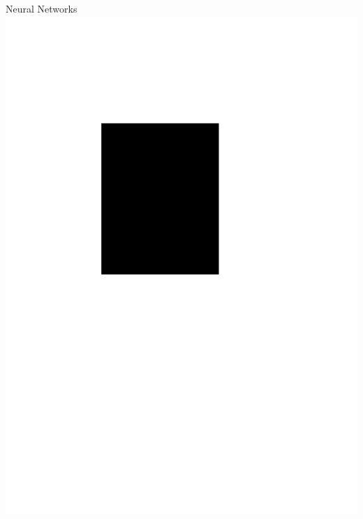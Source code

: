\documentclass[17pt,mathserif]{beamer}
\begin{document}
    \begin{frame}{Neural Networks}{}
      \vspace*{-3em}
      \includegraphics[width=\textwidth]{neuro-slam}
    \end{frame}
\end{document}
